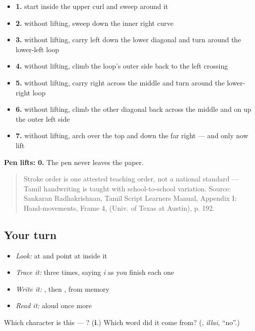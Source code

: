 \begin{itemize}
\raggedright
  \item \textbf{1.} start inside the upper curl and sweep around it
  \item \textbf{2.} without lifting, sweep down the inner right curve
  \item \textbf{3.} without lifting, carry left down the lower diagonal and turn around the lower-left loop
  \item \textbf{4.} without lifting, climb the loop's outer side back to the left crossing
  \item \textbf{5.} without lifting, carry right across the middle and turn around the lower-right loop
  \item \textbf{6.} without lifting, climb the other diagonal back across the middle and on up the outer left side
  \item \textbf{7.} without lifting, arch over the top and down the far right — and only now lift
\end{itemize}

\textbf{Pen lifts: 0.} The pen never leaves the paper.

\begin{quote}
Stroke order is one attested teaching order, not a national standard — Tamil handwriting is taught with school-to-school variation. Source: Sankaran Radhakrishnan, Tamil Script Learners Manual, Appendix I: Hand-movements, Frame 4,  (Univ. of Texas at Austin), p. 192.
\end{quote}

\subsection*{Your turn}
\begin{itemize}
\raggedright
  \item \emph{Look:} at \textbf{} and point at  inside it
  \item \emph{Trace it:}  three times, saying \emph{i} as you finish each one
  \item \emph{Write it:} , then , from memory
  \item \emph{Read it:} \textbf{} aloud once more
\end{itemize}

\begin{tcolorbox}[breakable,colback=teal!4,colframe=teal!35!black,title={Before you move on}]
Which character is this — ? (\textbf{i}.) Which word did it come from? (\textbf{}, \emph{illai}, \textquotedblleft{}no\textquotedblright{}.)
\end{tcolorbox}
